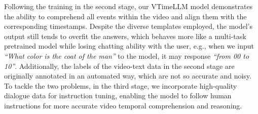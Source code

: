 \documentclass[10pt,twocolumn,letterpaper]{article}
\begin{document}
Following the training in the second stage, our VTimeLLM model demonstrates the ability to comprehend all events within the video and align them with the corresponding timestamps. Despite the diverse templates employed, the model's output still tends to overfit the answers, which behaves more like a multi-task pretrained model while losing chatting ability with the user, e.g., when we input \textit{``What color is the coat of the man''} to the model, it may response \textit{``from 00 to 10''}. Additionally, the labels of the video-text data in the second stage are originally annotated in an automated way, which are not so accurate and noisy. To tackle the two problems, in the third stage, we incorporate high-quality dialogue data for instruction tuning, enabling the model to follow human instructions for more accurate video temporal comprehension and reasoning.
\end{document}
